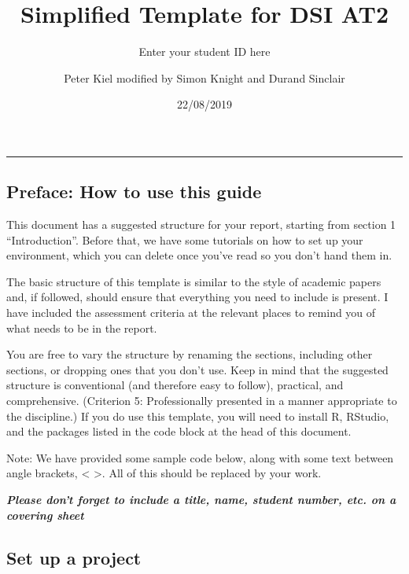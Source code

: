 \documentclass[
]{article}
\title{Simplified Template for DSI AT2}
\subtitle{Enter your student ID here}
\author{Peter Kiel modified by Simon Knight and Durand Sinclair}
\date{22/08/2019}
\begin{document}
\maketitle

{
\setcounter{tocdepth}{2}
\tableofcontents
}
\begin{center}\rule{0.5\linewidth}{0.5pt}\end{center}

\hypertarget{preface-how-to-use-this-guide}{%
\subsection{Preface: How to use this
guide}\label{preface-how-to-use-this-guide}}

This document has a suggested structure for your report, starting from
section 1 ``Introduction''. Before that, we have some tutorials on how
to set up your environment, which you can delete once you've read so you
don't hand them in.

The basic structure of this template is similar to the style of academic
papers and, if followed, should ensure that everything you need to
include is present. I have included the assessment criteria at the
relevant places to remind you of what needs to be in the report.

You are free to vary the structure by renaming the sections, including
other sections, or dropping ones that you don't use. Keep in mind that
the suggested structure is conventional (and therefore easy to follow),
practical, and comprehensive. (Criterion 5: Professionally presented in
a manner appropriate to the discipline.) If you do use this template,
you will need to install R, RStudio, and the packages listed in the code
block at the head of this document.

Note: We have provided some sample code below, along with some text
between angle brackets, \textless{} \textgreater. All of this should be
replaced by your work.

\textbf{\emph{Please don't forget to include a title, name, student
number, etc. on a covering sheet}}

\hypertarget{set-up-a-project}{%
\subsection{Set up a project}\label{set-up-a-project}}
\end{document}
